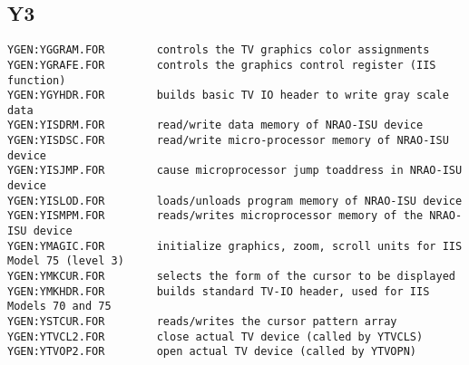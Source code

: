 \subsection{Y3}
\begin{verbatim}
YGEN:YGGRAM.FOR        controls the TV graphics color assignments
YGEN:YGRAFE.FOR        controls the graphics control register (IIS function)
YGEN:YGYHDR.FOR        builds basic TV IO header to write gray scale data
YGEN:YISDRM.FOR        read/write data memory of NRAO-ISU device
YGEN:YISDSC.FOR        read/write micro-processor memory of NRAO-ISU device
YGEN:YISJMP.FOR        cause microprocessor jump toaddress in NRAO-ISU device
YGEN:YISLOD.FOR        loads/unloads program memory of NRAO-ISU device
YGEN:YISMPM.FOR        reads/writes microprocessor memory of the NRAO-ISU device
YGEN:YMAGIC.FOR        initialize graphics, zoom, scroll units for IIS Model 75 (level 3)
YGEN:YMKCUR.FOR        selects the form of the cursor to be displayed
YGEN:YMKHDR.FOR        builds standard TV-IO header, used for IIS Models 70 and 75
YGEN:YSTCUR.FOR        reads/writes the cursor pattern array
YGEN:YTVCL2.FOR        close actual TV device (called by YTVCLS)
YGEN:YTVOP2.FOR        open actual TV device (called by YTVOPN)
\end{verbatim}
 
